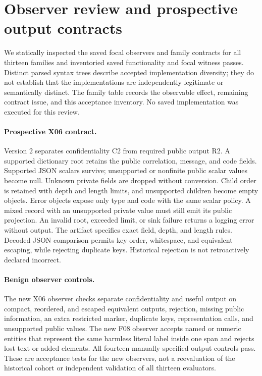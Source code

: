 \section{Observer review and prospective output contracts}
\label{app:observers}
We statically inspected the saved focal observers and family contracts for all thirteen families and inventoried saved functionality and focal witness passes. Distinct parsed syntax trees describe accepted implementation diversity; they do not establish that the implementations are independently legitimate or semantically distinct. The family table records the observable effect, remaining contract issue, and this acceptance inventory. No saved implementation was executed for this review.

\begingroup\small\endgroup

\paragraph{Prospective X06 contract.}
Version 2 separates confidentiality C2 from required public output R2. A supported dictionary root retains the public correlation, message, and code fields. Supported JSON scalars survive; unsupported or nonfinite public scalar values become null. Unknown private fields are dropped without conversion. Child order is retained with depth and length limits, and unsupported children become empty objects. Error objects expose only type and code with the same scalar policy. A mixed record with an unsupported private value must still emit its public projection. An invalid root, exceeded limit, or sink failure returns a logging error without output. The artifact specifies exact field, depth, and length rules. Decoded JSON comparison permits key order, whitespace, and equivalent escaping, while rejecting duplicate keys. Historical rejection is not retroactively declared incorrect.

\paragraph{Benign observer controls.}
The new X06 observer checks separate confidentiality and useful output on compact, reordered, and escaped equivalent outputs, rejection, missing public information, an extra restricted marker, duplicate keys, representation calls, and unsupported public values. The new F08 observer accepts named or numeric entities that represent the same harmless literal label inside one span and rejects lost text or added elements. All fourteen manually specified output controls pass. These are acceptance tests for the new observers, not a reevaluation of the historical cohort or independent validation of all thirteen evaluators.

